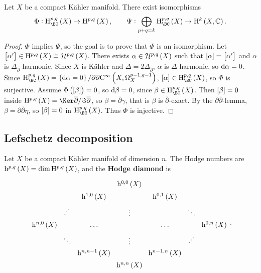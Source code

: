 \begin{theorem}
\label{thm:6.39}
Let $ X $ be a compact K\"ahler manifold. There exist isomorphisms
$$ \Phi : \H_{\BC}^{p, q}\br{X} \to \H^{p, q}\br{X}, \qquad \Psi : \bigoplus_{p + q = k} \H_{\BC}^{p, q}\br{X} \to \H^k\br{X, \CC}. $$
\end{theorem}

\begin{proof}
$ \Phi $ implies $ \Psi $, so the goal is to prove that $ \Phi $ is an isomorphism. Let $ \sbr{\alpha'} \in \H^{p, q}\br{X} \cong \HHH^{p, q}\br{X} $. There exists $ \alpha \in \HHH^{p, q}\br{X} $ such that $ \sbr{\alpha} = \sbr{\alpha'} $ and $ \alpha $ is $ \Delta_{\overline{\partial}} $-harmonic. Since $ X $ is K\"ahler and $ \Delta = 2\Delta_{\overline{\partial}} $, $ \alpha $ is $ \Delta $-harmonic, so $ \mathrm{d}\alpha = 0 $. Since $ \H_{\BC}^{p, q}\br{X} = \cbr{\d\alpha = 0} / \partial\overline{\partial}\C^\infty\br{X, \Omega_X^{p - 1, q - 1}} $, $ \sbr{\alpha} \in \H_{\BC}^{p, q}\br{X} $, so $ \Phi $ is surjective. Assume $ \Phi\br{\sbr{\beta}} = 0 $, so $ \mathrm{d}\beta = 0 $, since $ \beta \in \H_{\BC}^{p, q}\br{X} $. Then $ \sbr{\beta} = 0 $ inside $ \H^{p, q}\br{X} = \Ker \overline{\partial} / \Im \overline{\partial} $, so $ \beta = \overline{\partial}\gamma $, that is $ \beta $ is $ \overline{\partial} $-exact. By the $ \partial\overline{\partial} $-lemma, $ \beta = \partial\overline{\partial}\eta $, so $ \sbr{\beta} = 0 $ in $ \H_{\BC}^{p, q}\br{X} $. Thus $ \Phi $ is injective.
\end{proof}

\subsection{Lefschetz decomposition}


Let $ X $ be a compact K\"ahler manifold of dimension $ n $. The Hodge numbers are $ \h^{p, q}\br{X} = \dim \H^{p, q}\br{X} $, and the \textbf{Hodge diamond} is
$$
\begin{tikzcd}[column sep=0, row sep=0]
& & & \h^{0, 0}\br{X} & & & \\
& & \h^{1, 0}\br{X} & & \h^{0, 1}\br{X} & & \\
& {\displaystyle\cdot}^{{\displaystyle\cdot}^{\displaystyle\cdot}} & & \vdots & & \ddots & \\
\h^{n, 0}\br{X} & & \dots & & \dots & & \h^{0, n}\br{X} \\
& \ddots & & \vdots & & {\displaystyle\cdot}^{{\displaystyle\cdot}^{\displaystyle\cdot}} & \\
& & \h^{n, n - 1}\br{X} & & \h^{n - 1, n}\br{X} & & \\
& & & \h^{n, n}\br{X} & & &
\end{tikzcd}.
$$

